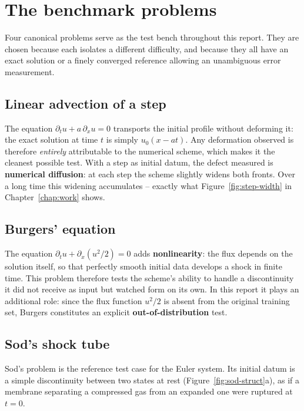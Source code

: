 \documentclass[12pt,a4paper,oneside]{report}
\begin{document}
\section{The benchmark problems}
\label{sec:problems}

Four canonical problems serve as the test bench throughout this report. They
are chosen because each isolates a different difficulty, and because they all
have an exact solution or a finely converged reference allowing an unambiguous
error measurement.

\subsection{Linear advection of a step}

The equation $\partial_t u + a\,\partial_x u = 0$ transports the initial
profile without deforming it: the exact solution at time $t$ is simply
$u_0(x - at)$. Any deformation observed is therefore \emph{entirely}
attributable to the numerical scheme, which makes it the cleanest possible
test. With a step as initial datum, the defect measured is \textbf{numerical
diffusion}: at each step the scheme slightly widens both fronts. Over a long
time this widening accumulates -- exactly what
Figure~\ref{fig:step-width} in Chapter~\ref{chap:work} shows.

\subsection{Burgers' equation}

The equation $\partial_t u + \partial_x (u^2/2) = 0$ adds
\textbf{nonlinearity}: the flux depends on the solution itself, so that
perfectly smooth initial data develops a shock in finite time. This problem
therefore tests the scheme's ability to handle a discontinuity it did not
receive as input but watched form on its own. In this report it plays an
additional role: since the flux function $u^2/2$ is absent from the original
training set, Burgers constitutes an explicit \textbf{out-of-distribution}
test.

\subsection{Sod's shock tube}

Sod's problem \cite{sod1978} is the reference test case for the Euler system.
Its initial datum is a simple discontinuity between two states at rest
(Figure~\ref{fig:sod-struct}a), as if a membrane separating a compressed gas
from an expanded one were ruptured at $t=0$.
\end{document}
